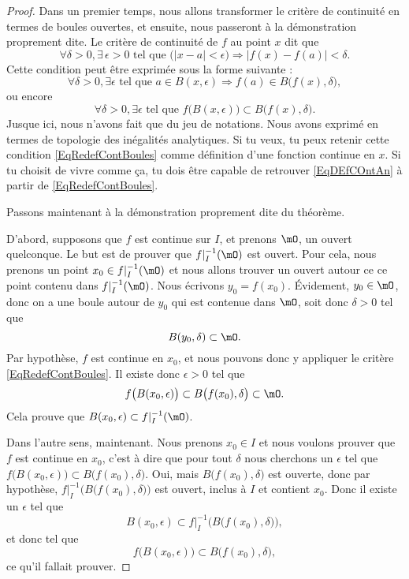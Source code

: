 \begin{proof}

Dans un premier temps, nous allons transformer le critère de continuité en termes de boules ouvertes, et ensuite, nous passeront à la démonstration proprement dite. Le critère de continuité de $f$ au point $x$ dit que
\begin{equation}        \label{EqDEfCOntAn}
  \forall \delta>0,\exists\,\epsilon>0\text{ tel que }\big( | x-a |< \epsilon \big)\Rightarrow| f(x)-f(a) |<\delta.
\end{equation}
Cette condition peut être exprimée sous la forme suivante :
\[ 
  \forall \delta>0,\exists\epsilon\text{ tel que } a\in B(x,\epsilon)\Rightarrow f(a)\in B\big( f(x),\delta \big),
\]
ou encore
\begin{equation}        \label{EqRedefContBoules}
  \forall \delta>0,\exists\epsilon\text{ tel que } f\big( B(x,\epsilon) \big)\subset B\big( f(x),\delta \big).
\end{equation}
Jusque ici, nous n'avons fait que du jeu de notations. Nous avons exprimé en termes de topologie des inégalités analytiques. Si tu veux, tu peux retenir cette condition \eqref{EqRedefContBoules} comme définition d'une fonction continue en $x$. Si tu choisit de vivre comme ça, tu dois être capable de retrouver \eqref{EqDEfCOntAn} à partir de \eqref{EqRedefContBoules}.
 
Passons maintenant à la démonstration proprement dite du théorème. 

D'abord, supposons que $f$ est continue sur $I$, et prenons $\mO$, un ouvert quelconque. Le but est de prouver que $f|_I^{-1}(\mO)$ est ouvert. Pour cela, nous prenons un point $x_0\in f|_I^{-1}(\mO)$ et nous allons trouver un ouvert autour ce ce point contenu dans $f|_I^{-1}(\mO)$. Nous écrivons $y_0=f(x_0)$. Évidement, $y_0\in\mO$, donc on a une boule autour de $y_0$ qui est contenue dans $\mO$, soit donc $\delta>0$ tel que
\[  
  B(y_0,\delta)\subset\mO.
\]
Par hypothèse, $f$ est continue en $x_0$, et nous pouvons donc y appliquer le critère \eqref{EqRedefContBoules}. Il existe donc $\epsilon>0$ tel que 
\[ 
  f\big( B(x_0,\epsilon) \big)\subset B\big( f(x_0),\delta \big)\subset\mO.
\]
Cela prouve que $B(x_0,\epsilon)\subset f|_I^{-1}(\mO)$.

Dans l'autre sens, maintenant. Nous prenons $x_0\in I$ et nous voulons prouver que $f$ est continue en $x_0$, c'est à dire que pour tout $\delta$ nous cherchons un $\epsilon$ tel que $f\big( B(x_0,\epsilon) \big)\subset B\big( f(x_0),\delta \big)$. Oui, mais $B\big( f(x_0),\delta \big)$ est ouverte, donc par hypothèse, $f|_I^{-1}\Big( B\big( f(x_0),\delta \big) \Big)$ est ouvert, inclus à $I$ et contient $x_0$. Donc il existe un $\epsilon$ tel que
\[ 
  B(x_0,\epsilon)\subset f|_I^{-1}\Big( B\big( f(x_0),\delta \big) \Big),
\]
et donc tel que 
\[ 
  f\big( B(x_0,\epsilon) \big)\subset B\big( f(x_0),\delta \big),
\]
ce qu'il fallait prouver.
\end{proof}


